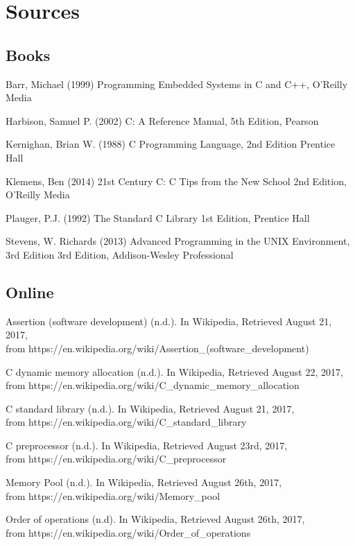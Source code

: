 \section{Sources}

\subsection{Books}

Barr, Michael (1999) Programming Embedded Systems in C and C++, O'Reilly Media

Harbison, Samuel P. (2002) C: A Reference Manual, 5th Edition, Pearson

Kernighan, Brian W. (1988) C Programming Language, 2nd Edition Prentice Hall 

Klemens, Ben (2014) 21st Century C: C Tips from the New School 2nd Edition, O'Reilly Media

Plauger, P.J. (1992) The Standard C Library 1st Edition, Prentice Hall

Stevens, W. Richards (2013) Advanced Programming in the UNIX Environment, 3rd Edition 3rd Edition, Addison-Wesley Professional

\subsection{Online}

Assertion (software development) (n.d.). In Wikipedia, Retrieved August 21, 2017, \\from https://en.wikipedia.org/wiki/Assertion\_(software\_development)

C dynamic memory allocation (n.d.). In Wikipedia, Retrieved August 22, 2017, \\from https://en.wikipedia.org/wiki/C\_dynamic\_memory\_allocation

C standard library (n.d.). In Wikipedia, Retrieved August 21, 2017, \\from https://en.wikipedia.org/wiki/C\_standard\_library

C preprocessor (n.d.). In Wikipedia, Retrieved August 23rd, 2017, \\from https://en.wikipedia.org/wiki/C\_preprocessor

Memory Pool (n.d.). In Wikipedia, Retrieved August 26th, 2017, \\from https://en.wikipedia.org/wiki/Memory\_pool

Order of operations (n.d). In Wikipedia, Retrieved August 26th, 2017, \\from https://en.wikipedia.org/wiki/Order\_of\_operations


